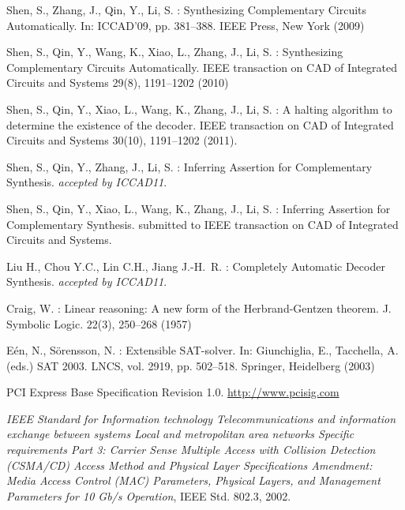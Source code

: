 \documentclass[runningheads,a4paper]{llncs}
\begin{document}

\begin{thebibliography}{4}

Shen, S.,
Zhang, J.,
Qin, Y.,
Li, S.
:
Synthesizing Complementary Circuits Automatically.
In: ICCAD'09,
pp. 381--388.
IEEE Press,
New York (2009)

Shen, S.,
Qin, Y.,
Wang, K.,
Xiao, L.,
Zhang, J.,
Li, S.
:
Synthesizing Complementary Circuits Automatically.
IEEE transaction on CAD of Integrated Circuits and Systems
29(8),
1191--1202
(2010)

Shen, S.,
Qin, Y.,
Xiao, L.,
Wang, K.,
Zhang, J.,
Li, S.
:
A halting algorithm to determine the existence of the decoder.
IEEE transaction on CAD of Integrated Circuits and Systems
30(10),
1191--1202
(2011).

Shen, S.,
Qin, Y.,
Zhang, J.,
Li, S.
:
Inferring Assertion for Complementary Synthesis.
\emph{accepted by ICCAD11}.

Shen, S.,
Qin, Y.,
Xiao, L.,
Wang, K.,
Zhang, J.,
Li, S.
:
Inferring Assertion for Complementary Synthesis.
submitted to IEEE transaction on CAD of Integrated Circuits and Systems.

Liu H.,
Chou Y.C.,
Lin C.H.,
Jiang J.-H.~R.
:
Completely Automatic Decoder Synthesis.
\emph{accepted by ICCAD11}.




Craig, W.
:
Linear reasoning: A new form of the Herbrand-Gentzen theorem.
J. Symbolic Logic. 22(3), 250--268 (1957)


E\'en, N.,
S\"orensson, N.
:
Extensible SAT-solver.
In: Giunchiglia, E., Tacchella, A. (eds.)
SAT 2003.
LNCS, vol. 2919,
pp. 502--518.
Springer, Heidelberg (2003)

PCI Express Base Specification Revision 1.0.
\url{http://www.pcisig.com}

\emph{IEEE Standard for Information technology Telecommunications and
  information exchange between systems Local and metropolitan area networks
  Specific requirements Part 3: Carrier Sense Multiple Access with Collision
  Detection (CSMA/CD) Access Method and Physical Layer Specifications
  Amendment: Media Access Control (MAC) Parameters, Physical Layers, and
  Management Parameters for 10 Gb/s Operation}, IEEE Std. 802.3, 2002.


\end{thebibliography}
\end{document}
